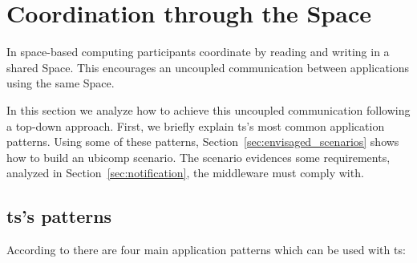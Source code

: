 
\section{Coordination through the Space}





In space-based computing participants coordinate by reading and writing in a shared Space. %
This encourages an uncoupled communication between applications using the same Space.

In this section we analyze how to achieve this uncoupled communication following a top-down approach.
First, we briefly explain \acl{ts}'s most common application patterns. %
Using some of these patterns, Section~\ref{sec:envisaged_scenarios} shows how to build an \ac{ubicomp} scenario.
The scenario evidences some requirements, analyzed in Section~\ref{sec:notification}, the middleware must comply with.



\subsection{\acl{ts}'s patterns}
\label{sec:ts_patterns}

According to \citet{freeman_javaspaces_1999} there are four main application patterns which can be used with \ac{ts}:

